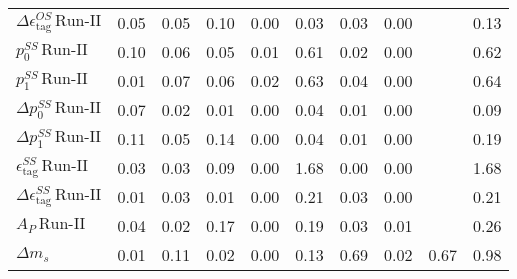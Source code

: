 \begin{tabular}{l  c  c  c  c  c  c  c  c  | c }
$\Delta \epsilon_{\text{tag}}^{OS} \, \text{Run-II}$ & 0.05 & 0.05 & 0.10 & 0.00 & 0.03 & 0.03 & 0.00 &  & 0.13 \\ 
$p_{0}^{SS} \, \text{Run-II}$ & 0.10 & 0.06 & 0.05 & 0.01 & 0.61 & 0.02 & 0.00 &  & 0.62 \\ 
$p_{1}^{SS} \, \text{Run-II}$ & 0.01 & 0.07 & 0.06 & 0.02 & 0.63 & 0.04 & 0.00 &  & 0.64 \\ 
$\Delta p_{0}^{SS} \, \text{Run-II}$ & 0.07 & 0.02 & 0.01 & 0.00 & 0.04 & 0.01 & 0.00 &  & 0.09 \\ 
$\Delta p_{1}^{SS} \, \text{Run-II}$ & 0.11 & 0.05 & 0.14 & 0.00 & 0.04 & 0.01 & 0.00 &  & 0.19 \\ 
$\epsilon_{\text{tag}}^{SS} \, \text{Run-II}$ & 0.03 & 0.03 & 0.09 & 0.00 & 1.68 & 0.00 & 0.00 &  & 1.68 \\ 
$\Delta \epsilon_{\text{tag}}^{SS} \, \text{Run-II}$ & 0.01 & 0.03 & 0.01 & 0.00 & 0.21 & 0.03 & 0.00 &  & 0.21 \\ 
$A_{P} \, \text{Run-II}$ & 0.04 & 0.02 & 0.17 & 0.00 & 0.19 & 0.03 & 0.01 &  & 0.26 \\ 
$\Delta m_{s}$ & 0.01 & 0.11 & 0.02 & 0.00 & 0.13 & 0.69 & 0.02 & 0.67 & 0.98 \\ 
\hline
\hline
\end{tabular}

